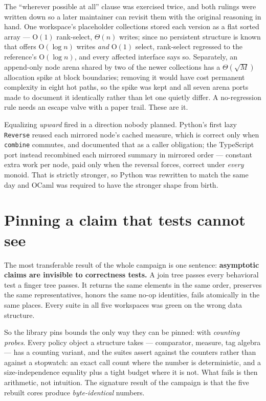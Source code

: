 \documentclass[11pt,twoside,openright]{book}
\newcommand{\code}[1]{\texorpdfstring{\textcolor{d7ink}{\texttt{#1}}}{#1}}
\newcommand{\term}[1]{\textit{#1}}
\newcommand{\bigoh}[1]{$\mathrm{O}(#1)$}
\begin{document}
The ``wherever possible at all'' clause was exercised twice, and both rulings
were written down so a later maintainer can revisit them with the original
reasoning in hand. One workspace's placeholder collections stored each version as
a flat sorted array --- \bigoh{1} rank-select, $\Theta(n)$ writes; since no
persistent structure is known that offers \bigoh{\log n} writes \emph{and}
\bigoh{1} select, rank-select regressed to the reference's \bigoh{\log n}, and
every affected interface says so. Separately, an append-only node arena shared by
two of the newer collections has a $\Theta(\sqrt M)$ allocation spike at block
boundaries; removing it would have cost permanent complexity in eight hot paths,
so the spike was kept and all seven arena ports made to document it identically
rather than let one quietly differ. A no-regression rule needs an escape valve
with a paper trail. These are it.

Equalizing \emph{upward} fired in a direction nobody planned. Python's first
lazy \code{Reverse} reused each mirrored node's cached measure, which is correct
only when \code{combine} commutes, and documented that as a caller obligation;
the TypeScript port instead recombined each mirrored summary in mirrored order
--- constant extra work per node, paid only when the reversal forces, correct
under \emph{every} monoid. That is strictly stronger, so Python was rewritten to
match the same day and OCaml was required to have the stronger shape from birth.

\section{Pinning a claim that tests cannot see}

The most transferable result of the whole campaign is one sentence:
\textbf{asymptotic claims are invisible to correctness tests.} A join tree passes
every behavioral test a finger tree passes. It returns the same elements in the
same order, preserves the same representatives, honors the same no-op identities,
fails atomically in the same places. Every suite in all five workspaces was green
on the wrong data structure.

So the library pins bounds the only way they can be pinned: with \term{counting
probes}. Every policy object a structure takes ---
comparator, measure, tag algebra --- has a counting variant, and the suites
assert against the counters rather than against a stopwatch: an exact call count
where the number is deterministic, and a size-independence equality plus a tight
budget where it is not. What fails is then arithmetic, not intuition. The
signature result of the campaign is that the five rebuilt cores produce
\emph{byte-identical} numbers.
\end{document}
